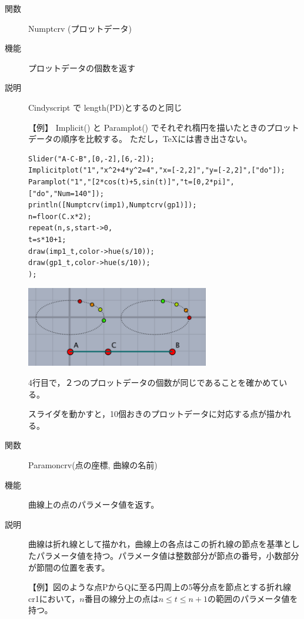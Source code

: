 \documentclass[papersize,a4paper,10pt,uplatex]{jsarticle}
\begin{document}
\begin{description}
\hypertarget{numptcrv}{}
\item[関数]Numptcrv (プロットデータ)
\item[機能]プロットデータの個数を返す
\item[説明]Cindyscript で length(PD)とするのと同じ

\vspace{\baselineskip}
【例】 Implicit() と Paramplot() でそれぞれ楕円を描いたときのプロットデータの順序を比較する。
ただし，TeXには書き出さない。

\begin{verbatim}
Slider("A-C-B",[0,-2],[6,-2]);
Implicitplot("1","x^2+4*y^2=4","x=[-2,2]","y=[-2,2]",["do"]);
Paramplot("1","[2*cos(t)+5,sin(t)]","t=[0,2*pi]",["do","Num=140"]);
println([Numptcrv(imp1),Numptcrv(gp1)]);
n=floor(C.x*2);
repeat(n,s,start->0,
t=s*10+1;
draw(imp1_t,color->hue(s/10));
draw(gp1_t,color->hue(s/10));
);
\end{verbatim}

\begin{center}
\includegraphics[bb=0.00 0.00 305.02 133.01,width=8cm]{Fig/numptcrv.pdf}
\end{center}

4行目で，２つのプロットデータの個数が同じであることを確かめている。

スライダを動かすと，10個おきのプロットデータに対応する点が描かれる。

\vspace{\baselineskip}
\hypertarget{paramoncrv}{}
\item[関数]Paramoncrv(点の座標, 曲線の名前)
\item[機能]曲線上の点のパラメータ値を返す。
\item[説明]曲線は折れ線として描かれ，曲線上の各点はこの折れ線の節点を基準としたパラメータ値を持つ。パラメータ値は整数部分が節点の番号，小数部分が節間の位置を表す。

\vspace{\baselineskip}
【例】図のような点PからQに至る円周上の5等分点を節点とする折れ線cr1において，$n$番目の線分上の点は$n\leq t\leq n+1$の範囲のパラメータ値を持つ。


\end{description}
\end{document}
